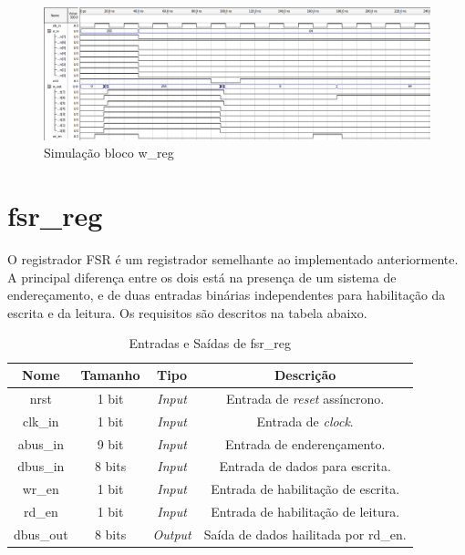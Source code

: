 \documentclass{article}
\begin{document}
\begin{figure}[ht]
\begin{center}
    \includegraphics[width=15cm]{images/w_reg.png}
    \caption{Simulação bloco w\_reg}
\end{center}
\end{figure}

\section{fsr\_reg}

O registrador FSR é um registrador semelhante ao implementado anteriormente. A principal diferença entre os dois está na presença de um sistema de endereçamento, e de duas entradas binárias independentes para habilitação da escrita e da leitura. Os requisitos são descritos na tabela abaixo.

\begin{table}
    \begin{center}
        \begin{tabular}{|c|c|c|c|}
            \hline
            Nome & Tamanho & Tipo & Descrição\\
            \hline
            nrst & 1 bit & \textit{Input} & Entrada de \textit{reset} assíncrono.\\
            \hline
            clk\_in & 1 bit & \textit{Input} & Entrada de \textit{clock}.\\
            \hline
            abus\_in & 9 bit & \textit{Input} & Entrada de enderençamento.\\
            \hline
            dbus\_in & 8 bits & \textit{Input} & Entrada de dados para escrita.\\
            \hline
            wr\_en & 1 bit & \textit{Input} & Entrada de habilitação de escrita.\\
            \hline
            rd\_en & 1 bit & \textit{Input} & Entrada de habilitação de leitura.\\
            \hline
            dbus\_out & 8 bits & \textit{Output} & Saída de dados hailitada por rd\_en.\\
            \hline
        \end{tabular}
    \end{center}
    \caption{Entradas e Saídas de fsr\_reg}
\end{table}
\end{document}
